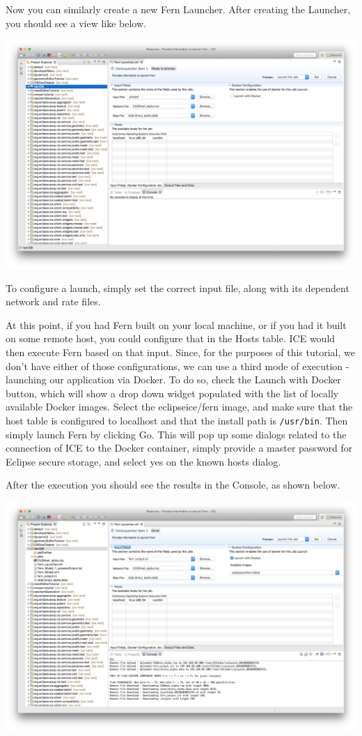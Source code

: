 Now you can similarly create a new Fern Launcher. After creating the Launcher,
you should see a view like below. 
\begin{center} \includegraphics[width=\textwidth]{figures/launcher}
\end{center}
To configure a launch, simply set the correct
input file, along with its dependent network and rate files. 

At this point, if you had Fern built on your local machine, or if you had it
built on some remote host, you could configure that in the Hosts table. ICE
would then execute Fern based on that input. Since, for the purposes of this
tutorial, we don't have either of those configurations, we can use a third mode
of execution - launching our application via Docker. To do so, check the Launch
with Docker button, which will show a drop down widget populated with the list
of locally available Docker images. Select the eclipseice/fern image, and make
sure that the host table is configured to localhost and that the install path is
\texttt{/usr/bin}. Then simply launch Fern by clicking Go. This will pop up some
dialogs related to the connection of ICE to the Docker container, simply provide
a master password for Eclipse secure storage, and select yes on the known hosts
dialog. 

After the execution you should see the results in the Console, as shown below.
\begin{center} \includegraphics[width=\textwidth]{figures/launcherResult}
\end{center}
